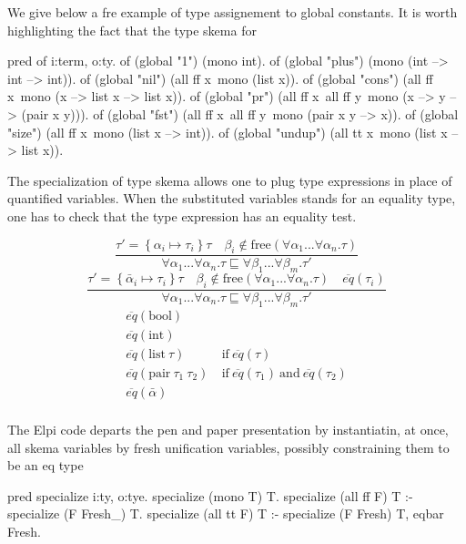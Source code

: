 \documentclass[a4paper, 11pt]{book}
\begin{document}
We give below a fre example of type assignement to global
constants. It is worth highlighting the fact that the
type skema for 


\begin{elpicode}
pred of i:term, o:ty.
of (global "1")      (mono int).
of (global "plus")   (mono (int --> int --> int)).
of (global "nil")    (all ff x\ mono (list x)).
of (global "cons")   (all ff x\ mono (x --> list x --> list x)).
of (global "pr")     (all ff x\ all ff y\ mono (x --> y --> (pair x y))).
of (global "fst")    (all ff x\ all ff y\ mono (pair x y --> x)).
of (global "size")   (all ff x\ mono (list x --> int)).
of (global "undup")  (all tt x\ mono (list x --> list x)).
\end{elpicode}
  

The specialization of type skema allows one to plug type expressions in place
of quantified variables. When the substituted variables stands for an
equality type, one has to check that the type expression has an equality test.

$$
\displaystyle\frac{\tau' = \left\{\alpha_i \mapsto \tau_i\right\} \tau \quad \beta_i \not\in \textrm{free}(\forall \alpha_1...\forall\alpha_n . \tau)}{\forall \alpha_1...\forall\alpha_n . \tau \sqsubseteq \forall \beta_1...\forall\beta_m . \tau'}
$$
$$
\displaystyle\frac{\tau' = \left\{\bar\alpha_i \mapsto \tau_i\right\} \tau \quad \beta_i \not\in \textrm{free}(\forall \alpha_1...\forall\alpha_n . \tau) \quad \overline{eq}(\tau_i)}{\forall \alpha_1...\forall\alpha_n . \tau \sqsubseteq \forall \beta_1...\forall\beta_m . \tau'}
$$
$$
\begin{array}{ll}
  \overline{eq}(\mbox{bool}) & \\
  \overline{eq}(\mbox{int}) & \\
  \overline{eq}(\mbox{list}~\tau) & ~\mbox{if}~ \overline{eq}(\tau) \\
  \overline{eq}(\mbox{pair}~\tau_1~\tau_2) & ~\mbox{if}~ \overline{eq}(\tau_1) ~\mbox{and}~ \overline{eq}(\tau_2)\\
  \overline{eq}(\bar\alpha) & \\
\end{array}
$$

The Elpi code departs the pen and paper presentation by instantiatin, at once,
all skema variables by fresh unification variables, possibly constraining them
to be an eq type

\begin{elpicode}
pred specialize i:ty, o:tye.
specialize (mono T) T.
specialize (all ff F) T :- specialize (F Fresh_) T.
specialize (all tt F) T :- specialize (F Fresh) T, eqbar Fresh.
\end{elpicode}
\end{document}

